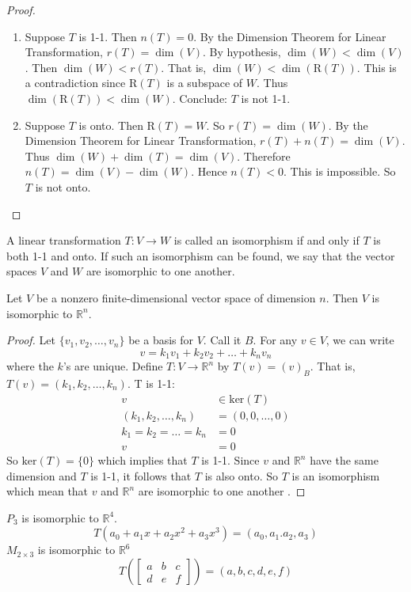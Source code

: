 \documentclass[12pt]{article}
\begin{document}
\begin{proof} \begin{enumerate} 
\item Suppose $T$ is 1-1. Then $n(T) = 0$. By the Dimension Theorem for Linear Transformation, $r(T) = \dim(V)$. By hypothesis, $\dim(W) < \dim(V)$. Then $\dim(W) < r(T)$. That is, $\dim(W) < \dim(\mathrm{R}(T))$. This is a contradiction since $\mathrm{R}(T)$ is a subspace of $W$. Thus $\dim(\mathrm{R}(T)) < \dim(W)$. Conclude: $T$ is not 1-1. \item Suppose $T$ is onto. Then $\mathrm{R}(T) = W$. So $r(T) = \dim(W)$. By the Dimension Theorem for Linear Transformation, $r(T) + n(T) = \dim(V)$. Thus $\dim(W) + \dim(T) = \dim(V)$. Therefore $n(T) = \dim(V) - \dim(W)$. Hence $n(T) < 0$. This is impossible. So $T$ is not onto. \end{enumerate} \end{proof} 
\begin{definition} A linear transformation $T: V \to W$ is called an isomorphism if and only if $T$ is both 1-1 and onto. If such an isomorphism can be found, we say that the vector spaces $V$ and $W$ are isomorphic to one another. \end{definition} 
\begin{theorem} Let $V$ be a nonzero finite-dimensional vector space of dimension $n$. Then $V$ is isomorphic to $\mathbb{R}^n$. \end{theorem} 
\begin{proof} Let $\{v_1, v_2, \dots, v_n \}$ be a basis for $V$. Call it $B$. For any $v \in V$, we can write $$v = k_1v_1 + k_2v_2 + \dots + k_nv_n $$ where the $k$'s are unique. Define $T: V \to \mathbb{R}^n$ by $T(v) = (v)_B$. That is, $T(v) = (k_1, k_2, \dots, k_n)$. \newline T is 1-1: $$\begin{aligned} v &\in \mathrm{ker}(T) \\ (k_1, k_2, \dots, k_n) &= (0, 0, \dots, 0) \\ k_1 = k_2 = \dots = k_n &= 0 \\ v &= 0 \end{aligned} $$ So $\mathrm{ker}(T) = \{0\}$ which implies that $T$ is 1-1. \newline Since $v$ and $\mathbb{R}^n$ have the same dimension and $T$ is 1-1, it follows that $T$ is also onto. So $T$ is an isomorphism which mean that $v$ and $\mathbb{R}^n$ are isomorphic to one another . \end{proof} 
\begin{example} $P_3$ is isomorphic to $\mathbb{R}^4$. $$T(a_0 + a_1x + a_2x^2 + a_3x^3) = (a_0, a_1. a_2, a_3) $$ $M_{2 \times 3}$ is isomorphic to $\mathbb{R}^6$
$$T(\begin{bmatrix} a & b & c \\ d & e & f \end{bmatrix}) = (a, b, c, d, e, f) $$ \end{example} 
\end{document}
